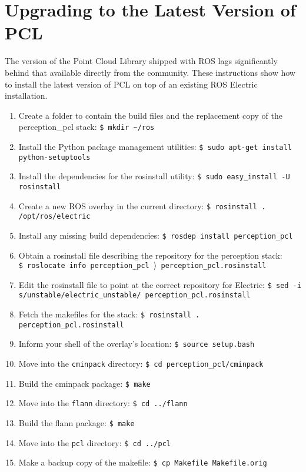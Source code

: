 \documentclass[12pt]{report}
\begin{document}
\section{Upgrading to the Latest Version of PCL}
\label{apx:upgrade}
The version of the Point Cloud Library shipped with ROS lags significantly behind that available directly from the community.  These instructions show how to install the latest version of PCL on top of an existing ROS Electric installation.
\begin{sloppypar}
\begin{enumerate}
\item{Create a folder to contain the build files and the replacement copy of the perception\_pcl stack: \texttt{\$\ mkdir \~{}/ros}}
\item{Install the Python package management utilities: \texttt{\$\ sudo apt-get install python-setuptools}}
\item{Install the dependencies for the rosinstall utility: \texttt{\$\ sudo easy\_install -U rosinstall}}
\item{Create a new ROS overlay in the current directory: \texttt{\$\ rosinstall . /opt/ros/electric}}
\item{Install any missing build dependencies: \texttt{\$\ rosdep install perception\_pcl}}
\item{Obtain a rosinstall file describing the repository for the perception stack: \texttt{\$\ roslocate info perception\_pcl $\rangle$ perception\_pcl.rosinstall}}
\item{Edit the rosinstall file to point at the correct repository for Electric: \texttt{\$\ sed -i s/unstable/electric\_unstable/ perception\_pcl.rosinstall }}
\item{Fetch the makefiles for the stack: \texttt{\$\ rosinstall . perception\_pcl.rosinstall}}
\item{Inform your shell of the overlay's location: \texttt{\$\ source setup.bash}}
\item{Move into the \texttt{cminpack} directory: \texttt{\$\ cd perception\_pcl/cminpack}}
\item{Build the cminpack package: \texttt{\$\ make}}
\item{Move into the \texttt{flann} directory: \texttt{\$\ cd ../flann}}
\item{Build the flann package: \texttt{\$\ make}}
\item{Move into the \texttt{pcl} directory: \texttt{\$\ cd ../pcl}}
\item{Make a backup copy of the makefile: \texttt{\$\ cp Makefile Makefile.orig}}

\end{enumerate}
\end{sloppypar}
\end{document}
